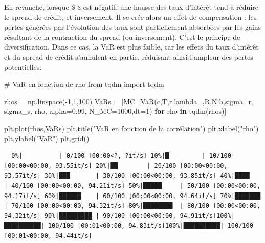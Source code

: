 \documentclass[
  letterpaper,
  DIV=11,
  numbers=noendperiod]{scrartcl}
\newenvironment{Shaded}{\begin{snugshade}}{\end{snugshade}}
\newcommand{\CommentTok}[1]{\textcolor[rgb]{0.37,0.37,0.37}{#1}}
\newcommand{\ControlFlowTok}[1]{\textcolor[rgb]{0.00,0.23,0.31}{\textbf{#1}}}
\newcommand{\DecValTok}[1]{\textcolor[rgb]{0.68,0.00,0.00}{#1}}
\newcommand{\FloatTok}[1]{\textcolor[rgb]{0.68,0.00,0.00}{#1}}
\newcommand{\ImportTok}[1]{\textcolor[rgb]{0.00,0.46,0.62}{#1}}
\newcommand{\KeywordTok}[1]{\textcolor[rgb]{0.00,0.23,0.31}{\textbf{#1}}}
\newcommand{\NormalTok}[1]{\textcolor[rgb]{0.00,0.23,0.31}{#1}}
\newcommand{\OperatorTok}[1]{\textcolor[rgb]{0.37,0.37,0.37}{#1}}
\newcommand{\StringTok}[1]{\textcolor[rgb]{0.13,0.47,0.30}{#1}}
\begin{document}
En revanche, lorsque \$ \rho \$ est négatif, une hausse des taux
d'intérêt tend à réduire le spread de crédit, et inversement. Il se crée
alors un effet de compensation : les pertes générées par l'évolution des
taux sont partiellement absorbées par les gains résultant de la
contraction du spread (ou inversement). C'est le principe de
diversification. Dans ce cas, la VaR est plus faible, car les effets du
taux d'intérêt et du spread de crédit s'annulent en partie, réduisant
ainsi l'ampleur des pertes potentielles.

\begin{Shaded}
\begin{Highlighting}[]
\CommentTok{\# VaR en fonction de rho}
\ImportTok{from}\NormalTok{ tqdm }\ImportTok{import}\NormalTok{ tqdm }

\NormalTok{rhos }\OperatorTok{=}\NormalTok{ np.linspace(}\OperatorTok{{-}}\DecValTok{1}\NormalTok{,}\DecValTok{1}\NormalTok{,}\DecValTok{100}\NormalTok{)}
\NormalTok{VaRs }\OperatorTok{=}\NormalTok{ [MC\_VaR(c,T,r,lambda\_,R,N,h,sigma\_r, sigma\_s, rho, alpha}\OperatorTok{=}\FloatTok{0.99}\NormalTok{, N\_MC}\OperatorTok{=}\DecValTok{1000}\NormalTok{,dt}\OperatorTok{=}\DecValTok{1}\NormalTok{) }\ControlFlowTok{for}\NormalTok{ rho }\KeywordTok{in}\NormalTok{ tqdm(rhos)]}

\NormalTok{plt.plot(rhos,VaRs)}
\NormalTok{plt.title(}\StringTok{"VaR en fonction de la corrélation"}\NormalTok{)}
\NormalTok{plt.xlabel(}\StringTok{"rho"}\NormalTok{)}
\NormalTok{plt.ylabel(}\StringTok{"VaR"}\NormalTok{)}
\NormalTok{plt.grid()}
\end{Highlighting}
\end{Shaded}

\begin{verbatim}
  0%|          | 0/100 [00:00<?, ?it/s] 10%|█         | 10/100 [00:00<00:00, 93.55it/s] 20%|██        | 20/100 [00:00<00:00, 93.57it/s] 30%|███       | 30/100 [00:00<00:00, 93.85it/s] 40%|████      | 40/100 [00:00<00:00, 94.21it/s] 50%|█████     | 50/100 [00:00<00:00, 94.17it/s] 60%|██████    | 60/100 [00:00<00:00, 94.64it/s] 70%|███████   | 70/100 [00:00<00:00, 94.32it/s] 80%|████████  | 80/100 [00:00<00:00, 94.32it/s] 90%|█████████ | 90/100 [00:00<00:00, 94.91it/s]100%|██████████| 100/100 [00:01<00:00, 94.83it/s]100%|██████████| 100/100 [00:01<00:00, 94.44it/s]
\end{verbatim}
\end{document}
